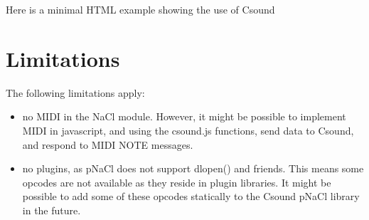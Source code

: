 \documentclass[11pt]{article}
\begin{document}
Here is a minimal HTML example showing the use of Csound



\section{Limitations}

The following limitations apply:

\begin{itemize}
\item no MIDI in the NaCl module. However, it might be possible to implement MIDI in javascript, and using the csound.js functions,
send data to Csound, and respond to MIDI NOTE messages.
\item no plugins, as pNaCl does not support dlopen() and friends. This means some opcodes are not available as they reside in plugin libraries.
It might be possible to add some of these opcodes statically to the Csound pNaCl library in the future.
\end {itemize}
\end{document}
